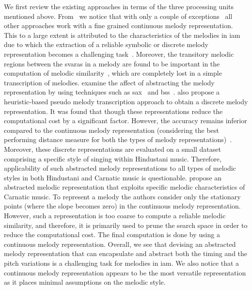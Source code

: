 We first review the existing approaches in terms of the three processing units mentioned above. From~ we notice that with only a couple of exceptions~\citep{Ross2012b,ganguli2015efficient} all other approaches work with a fine grained continuous melody representation. This to a large extent is attributed to the characteristics of the melodies in \gls{iam} due to which the extraction of a reliable symbolic or discrete melody representation becomes a challenging task~. Moreover, the transitory melodic regions between the \glspl{svara} in a melody are found to be important in the computation of melodic similarity~, which are completely lost in a simple transcription of melodies. \cite{Ross2012b,ganguli2015efficient} examine the affect of abstracting the melody representation by using techniques such as \gls{sax}~\citep{Lin2003} and \gls{bss}~\citep{tanaka2005discovery}. \cite{ganguli2015efficient} also propose a heuristic-based pseudo melody transcription approach to obtain a discrete melody representation. It was found that though these representations reduce the computational cost by a significant factor. However, the accuracy remains inferior compared to the continuous melody representation (considering the best performing distance measure for both the types of melody representations)~\cite{Ross2012b,ganguli2015efficient}. Moreover, these discrete representations are evaluated on a small dataset comprising a specific style of singing within Hindustani music. Therefore, applicability of such abstracted melody representations to all types of melodic styles in both Hindustani and Carnatic music is questionable. \cite{Ishwar2013,Dutta2014,dutta2014modified} propose an abstracted melodic representation that exploits specific melodic characteristics of Carnatic music. To represent a melody the authors consider only the stationary points (where the slope becomes zero) in the continuous melody representation. However, such a representation is too coarse to compute a reliable melodic similarity, and therefore, it is primarily used to prune the search space in order to reduce the computational cost. The final computation is done by using a continuous melody representation. Overall, we see that devising an abstracted melody representation that can encapsulate and abstract both the timing and the pitch variations is a challenging task for melodies in \gls{iam}. We also notice that a continuous melody representation appears to be the most versatile representation as it places minimal assumptions on the melodic style. 

